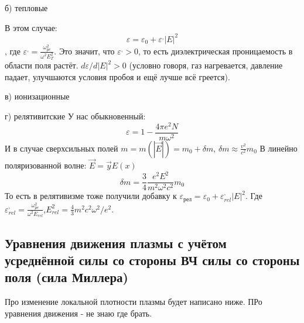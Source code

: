\documentclass[10pt, a4paper]{article}
\begin{document}
б) тепловые


В этом случае:
\begin{equation}
	\varepsilon=\varepsilon_0 +\varepsilon^{,} |E|^2
\end{equation}
, где $\varepsilon^{,}=\frac{\omega^2_{pe}}{\omega^2 E^2_T}$.
Это значит, что $\varepsilon^{,}>0$, то есть диэлектрическая проницаемость в области поля растёт. $d \varepsilon/d|E|^2 >0$ (условно говоря, газ нагревается, давление падает, улучшаются условия пробоя и ещё лучше всё греется).


в) ионизационные


г) релятивитские
У нас обыкновенный:
\begin{equation}
	\varepsilon=1-\frac{4 \pi e^2 N}{m \omega^2}
\end{equation}
И в случае сверхсильных полей $m=m(|\vec E|)=m_0 + \delta m$, $\delta m \approx \frac{v^2}{c^2} m_0$
В линейно поляризованной волне: $\vec E= \vec y E(x)$
 \begin{equation}
 	\delta m= \frac{3}{4} \frac{e^2 E^2}{m^2 \omega^2 c^2} m_0
 \end{equation}
То есть в релятивизме тоже получили добавку к $\varepsilon_{\text{рел}}=\varepsilon_0 + \varepsilon^{,}_{rel} |E|^2$. Где $\varepsilon^{,}_{rel}=\frac{\omega^2_{pe}}{\omega^2 E_{rel}}$,$E^2_{rel}=\frac{4}{3}m^2c^2\omega^2/e^2$.


\subsection{Уравнения движения плазмы с учётом усреднённой силы со стороны ВЧ силы со стороны поля (сила Миллера)}
Про изменение локальной плотности плазмы будет написано ниже. ПРо уравнения движения - не знаю где брать.
\end{document}
